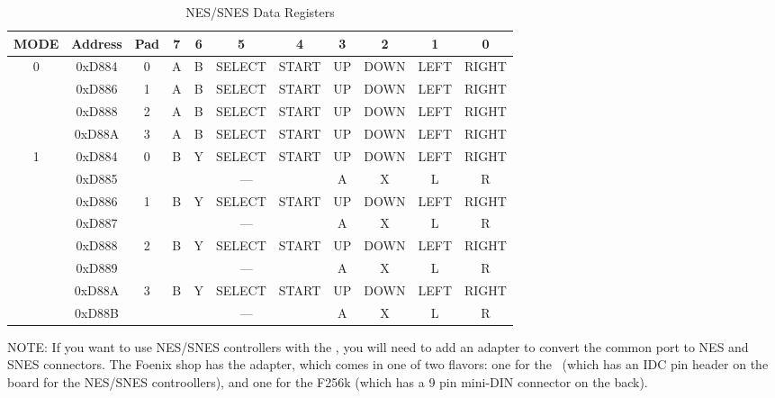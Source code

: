 \begin{table}[ht]
    \begin{center}
        \begin{tabular}{|c|c|c|c|c|c|c|c|c|c|c|} \hline
            MODE & Address & Pad & 7 & 6 & 5 & 4 & 3 & 2 & 1 & 0 \\\hline\hline
            \multirow{4}{*}{0} & 0xD884 & 0 & A & B & SELECT & START & UP & DOWN & LEFT & RIGHT \\\cline{2-11}
                & 0xD886 & 1 & A & B & SELECT & START & UP & DOWN & LEFT & RIGHT \\\cline{2-11}
                & 0xD888 & 2 & A & B & SELECT & START & UP & DOWN & LEFT & RIGHT \\\cline{2-11}
                & 0xD88A & 3 & A & B & SELECT & START & UP & DOWN & LEFT & RIGHT \\\hline\hline

            \multirow{8}{*}{1} & 0xD884 & \multirow{2}{*}{0} & B & Y & SELECT & START & UP & DOWN & LEFT & RIGHT \\\cline{2-2}\cline{4-11}
                               & 0xD885 &                    & \multicolumn{4}{|c|}{---} & A & X & L & R \\\cline{2-11}
                               & 0xD886 & \multirow{2}{*}{1} & B & Y & SELECT & START & UP & DOWN & LEFT & RIGHT \\\cline{2-2}\cline{4-11}
                               & 0xD887 &                    & \multicolumn{4}{|c|}{---} & A & X & L & R \\\cline{2-11}
                               & 0xD888 & \multirow{2}{*}{2} & B & Y & SELECT & START & UP & DOWN & LEFT & RIGHT \\\cline{2-2}\cline{4-11}
                               & 0xD889 &                    & \multicolumn{4}{|c|}{---} & A & X & L & R \\\cline{2-11}
                               & 0xD88A & \multirow{2}{*}{3} & B & Y & SELECT & START & UP & DOWN & LEFT & RIGHT \\\cline{2-2}\cline{4-11}
                               & 0xD88B &                    & \multicolumn{4}{|c|}{---} & A & X & L & R \\\hline
        \end{tabular}
    \end{center}
    \caption{NES/SNES Data Registers}
    \label{tab:nes_data_reg}
\end{table}

NOTE: If you want to use NES/SNES controllers with the \jr, you will need to add an adapter to convert the common port to NES and SNES connectors. The Foenix shop has the adapter, which comes in one of two flavors: one for the \jr\ (which has an IDC pin header on the board for the NES/SNES controollers), and one for the F256k (which has a 9 pin mini-DIN connector on the back).